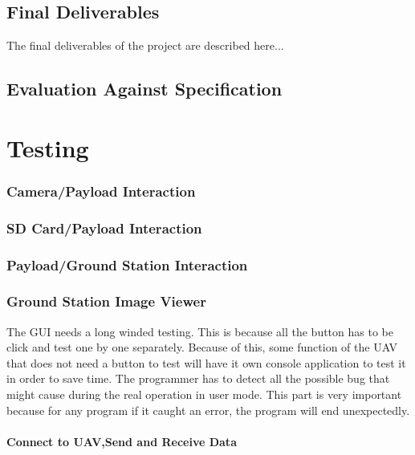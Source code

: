 \documentclass[oneside]{ecsgdp}         %
\begin{document}
\section{Final Deliverables}
The final deliverables of the project are described here...

\section{Evaluation Against Specification}


\chapter{Testing}

\subsection{Camera/Payload Interaction}

\subsection{SD Card/Payload Interaction}

\subsection{Payload/Ground Station Interaction}

\subsection{Ground Station Image Viewer}
The GUI needs a long winded testing. This is because all the button has to be click and test one by one separately. Because of this, some function of the UAV that does not need a button to test will have it own console application to test it in order to save time. The programmer has to detect all the possible bug that might cause during the real operation in user mode. This part is very important because for any program if it caught an error, the program will end unexpectedly.
\subsubsection*{Connect to UAV,Send and Receive Data}
\end{document}
